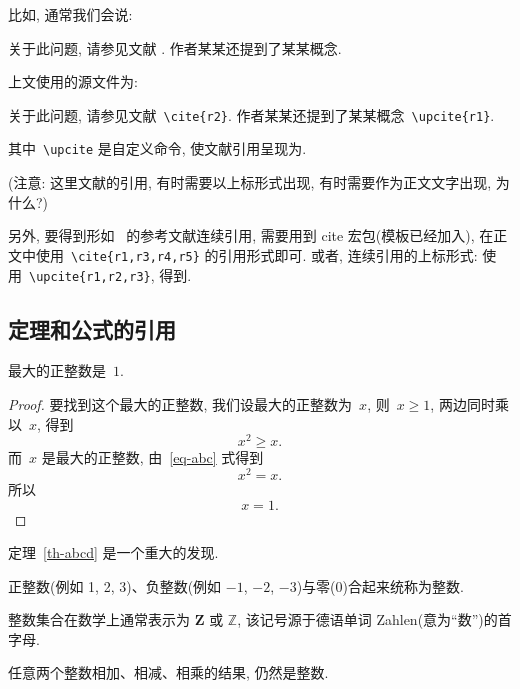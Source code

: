 \documentclass[forprint]{HedaBachelor}
\begin{document}
比如, 通常我们会说:

 {\kaishu
关于此问题, 请参见文献 \cite{r2}. 作者某某还提到了某某概念.}


上文使用的源文件为:

 {\kaishu
关于此问题, 请参见文献~\verb|\cite{r2}|. 作者某某还提到了某某概念~\verb|\upcite{r1}|.
}

其中~\verb|\upcite| 是自定义命令, 使文献引用呈现为.

({\heiti 注意:} {\kaishu 这里文献的引用, 有时需要以上标形式出现, 有时需要作为正文文字出现, 为什么?})

另外, 要得到形如~\cite{r1,r3,r4,r5} 的参考文献连续引用, 需要用到 cite 宏包(模板已经加入),
在正文中使用~\verb|\cite{r1,r3,r4,r5}| 的引用形式即可.
或者, 连续引用的上标形式: 使用~\verb|\upcite{r1,r2,r3}|, 得到.

\subsection{定理和公式的引用}

\begin{theorem}[谁发现的]\label{th-abcd}
最大的正整数是~$1$.
\end{theorem}

\begin{proof}
要找到这个最大的正整数, 我们设最大的正整数为~$x$, 则~$x \geqslant 1$, 两边同时乘以~$x$, 得到
\begin{equation}\label{eq-abc}
x^2 \geqslant x.
\end{equation}
而~$x$ 是最大的正整数, 由~\eqref{eq-abc} 式得到
\[
x^2 = x.
\]
所以
\begin{equation*}
x = 1.
\end{equation*}
\end{proof}

定理~\ref{th-abcd} 是一个重大的发现.

\begin{definition}[整数]
 正整数(例如 1, 2, 3)、负整数(例如 ${−1}$, $−2$, $−3$)与零(0)合起来统称为{\heiti 整数}.
\end{definition}

\begin{remark}
  整数集合在数学上通常表示为 $\mathbf{Z}$ 或 $\mathbb{Z}$, 该记号源于德语单词 Zahlen(意为``数'')的首字母.
\end{remark}

\begin{proposition}
任意两个整数相加、相减、相乘的结果, 仍然是整数.
\end{proposition}
\end{document}
